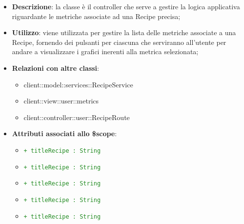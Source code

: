 			\begin{itemize}
				\item \textbf{Descrizione}: la classe è il controller che serve a gestire la logica applicativa riguardante le metriche associate ad una Recipe precisa;
				\item \textbf{Utilizzo}: viene utilizzata per gestire la lista delle metriche associate a una Recipe, fornendo dei pulsanti per ciascuna che serviranno all'utente per andare a visualizzare i grafici inerenti alla metrica selezionata;
				\item \textbf{Relazioni con altre classi}:
					\begin{itemize}
						\item client::model::services::RecipeService
						\item client::view::user::metrics
						\item client::controller::user::RecipeRoute
					\end{itemize}

				\item \textbf{Attributi associati allo \$scope}:
					\begin{itemize}
						\item \textcolor{forestgreen}{\texttt{+ titleRecipe : String}}
						\item \textcolor{forestgreen}{\texttt{+ titleRecipe : String}}
						\item \textcolor{forestgreen}{\texttt{+ titleRecipe : String}}
						\item \textcolor{forestgreen}{\texttt{+ titleRecipe : String}}
						\item \textcolor{forestgreen}{\texttt{+ titleRecipe : String}}


\end{itemize}
\end{itemize}

